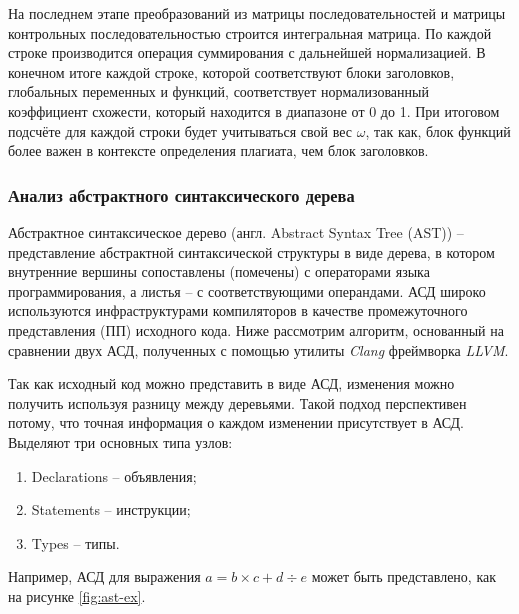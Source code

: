 На последнем этапе преобразований из матрицы последовательностей и матрицы контрольных последовательностью строится интегральная матрица. По каждой строке производится операция суммирования с дальнейшей нормализацией. В конечном итоге каждой строке, которой соответствуют блоки заголовков, глобальных переменных и функций, соответствует нормализованный коэффициент схожести, который находится в диапазоне от 0 до 1. При итоговом подсчёте для каждой строки будет учитываться свой вес $\omega$, так как, блок функций более важен в контексте определения плагиата, чем блок заголовков.

\subsubsection{Анализ абстрактного синтаксического дерева}

Абстрактное синтаксическое дерево (англ. Abstract Syntax Tree (AST\cite{AST})) -- представление абстрактной синтаксической структуры в виде дерева, в котором внутренние вершины сопоставлены (помечены) с операторами языка программирования, а листья -- с соответствующими операндами. АСД широко используются инфраструктурами компиляторов в качестве промежуточного представления (ПП) исходного кода. Ниже рассмотрим алгоритм, основанный на сравнении двух АСД, полученных с помощью утилиты \textit{Clang}\cite{clang} фреймворка \textit{LLVM}\cite{llvm}.

Так как исходный код можно представить в виде АСД, изменения можно получить используя разницу между деревьями. Такой подход перспективен потому, что точная информация о каждом изменении присутствует в АСД. Выделяют три основных типа узлов:
\begin{enumerate}
	\item Declarations -- объявления;
	\item Statements -- инструкции;
	\item Types -- типы.
\end{enumerate}

Например, АСД для выражения $a=b\times c +d\div e$ может быть представлено, как на рисунке \ref{fig:ast-ex}.

\clearpage

